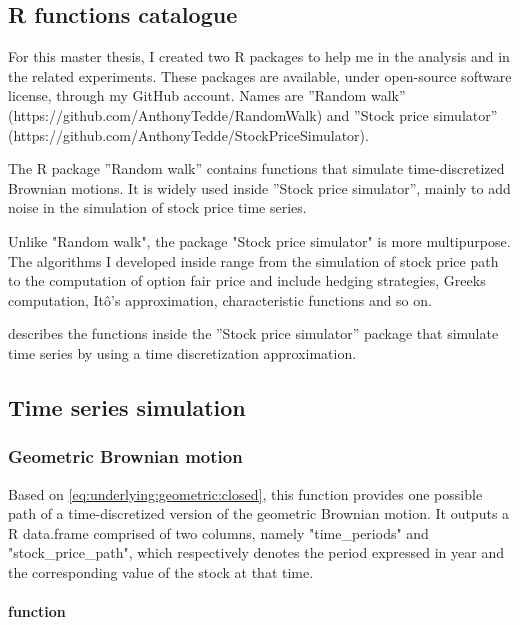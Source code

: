 \documentclass[12pt]{report}
\begin{document}
\begin{appendices}
\chapter{R functions catalogue}


For this master thesis, I created two R packages to help me in the analysis and in the related experiments. These packages are available, under open-source software license, through my GitHub account. Names are ”Random walk”  (https://github.com/AnthonyTedde/RandomWalk) and ”Stock price simulator” (https://github.com/AnthonyTedde/StockPriceSimulator).

The R package ”Random walk” contains functions that simulate time-discretized Brownian motions. It is widely used inside ”Stock price simulator”, mainly to add noise in the simulation of stock price time series. 

Unlike "Random walk", the package "Stock price simulator" is more multipurpose. The algorithms I developed inside range from the simulation of stock price path to the computation of option fair price and include hedging strategies, Greeks computation, Itô's approximation, characteristic functions and so on.

 describes the functions inside the ”Stock price simulator” package that simulate time series by using a time discretization approximation.

\section{Time series simulation}
\label{sec:r:time}

%
\subsection{Geometric Brownian motion}
\label{sub:r:time:geometric}

Based on \cref{eq:underlying:geometric:closed}, this function provides one possible path of a time-discretized version of the geometric Brownian motion.
It outputs a R data.frame comprised of two columns, namely "time\_periods" and "stock\_price\_path", which respectively denotes the period expressed in year and the corresponding value of the stock at that time.

\subsubsection*{function}


\end{appendices}
\end{document}
